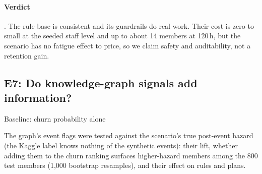 \documentclass[paper=a4, fontsize=11pt, open=any, parskip=half-,
  headings=small, numbers=noenddot, captions=tableheading, toc=flat]{scrreprt}
\begin{document}
\paragraph{Verdict} . The rule base is consistent and its guardrails do real work. Their cost is zero to small at the seeded staff level and up to about 14 members at 120\,h, but the scenario has no fatigue effect to price, so we claim safety and auditability, not a retention gain.

\subsection{E7: Do knowledge-graph signals add information?}
\label{sec:e7}
\quad\textsf{\small Baseline: churn probability alone}

The graph's event flags were tested against the scenario's true post-event hazard (the Kaggle label knows nothing of the synthetic events): their lift, whether adding them to the churn ranking surfaces higher-hazard members among the 800 test members (1,000 bootstrap resamples), and their effect on rules and plans.
\end{document}
